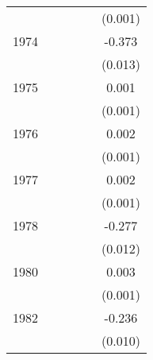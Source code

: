 {\begin{tabular}{l*{5}{c}}
                    &                     &                     &                     &                     &     (0.001)         \\
[1em]
1974                &                     &                     &                     &                     &      -0.373\sym{***}\\
                    &                     &                     &                     &                     &     (0.013)         \\
[1em]
1975                &                     &                     &                     &                     &       0.001         \\
                    &                     &                     &                     &                     &     (0.001)         \\
[1em]
1976                &                     &                     &                     &                     &       0.002         \\
                    &                     &                     &                     &                     &     (0.001)         \\
[1em]
1977                &                     &                     &                     &                     &       0.002         \\
                    &                     &                     &                     &                     &     (0.001)         \\
[1em]
1978                &                     &                     &                     &                     &      -0.277\sym{***}\\
                    &                     &                     &                     &                     &     (0.012)         \\
[1em]
1980                &                     &                     &                     &                     &       0.003\sym{***}\\
                    &                     &                     &                     &                     &     (0.001)         \\
[1em]
1982                &                     &                     &                     &                     &      -0.236\sym{***}\\
                    &                     &                     &                     &                     &     (0.010)         \\

\end{tabular}}
